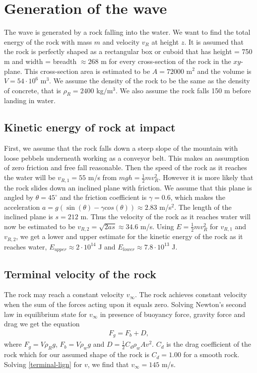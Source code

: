 \documentclass[11pt]{article}
\begin{document}
\section{Generation of the wave}
The wave is generated by a rock falling into the water. We want to find the total energy of the rock with mass $m$ and velocity $v_R$ at height $z$. It is assumed that the rock is
perfectly shaped as a rectangular box or cuboid that has height = 750 m and  width = breadth $\approx 268$ m for every cross-section of the rock in the $xy$-plane. This cross-section area
is estimated to be  $A=72000$ m$^2$ and the volume is $V= 54 \cdot 10^6$ m$^3$. We assume the density of the rock to be the same as the density of concrete, that is $\rho_{R}=2400$ kg$/$m$^3$.
We also assume the rock falls 150 m before landing in water.

\subsection{Kinetic energy of rock at impact}
First, we assume that the rock falls down a steep slope of the mountain with loose pebbels underneath working as a conveyor belt. This makes an assumption of zero friction and free fall reasonable.
Then the speed of the rock as it reaches the water will be $v_{R,1}=55$ m/s from $mgh=\frac{1}{2}mv_R^2$. However it is more likely that the rock slides down an inclined plane with friction.
We assume that this plane is angled by $\theta=45^{\circ}$  and the friction coefficient is $\gamma=0.6$, which makes the acceleration $a=g(\sin(\theta) - \gamma cos(\theta)) \approx 2.83$ m/s$^2$.
The length of the inclined plane is $s=212$ m. Thus the velocity of the rock as it reaches water will now be estimated to be $v_{R,2}=\sqrt{2as} \approx 34.6$ m/s.
Using $E =\frac{1}{2}m v_R^2$ for $v_{R,1}$ and $v_{R,2}$, we get a lower and upper estimate for the kinetic energy of the rock as it reaches water, $E_{upper} \approx 2 \cdot 10^{14}$ J and $E_{lower} \approx 7.8 \cdot 10^{13}$ J.

\subsection{Terminal velocity of the rock}
The rock may reach a constant velocity $v_{\infty}$. The rock achieves constant velocity when the sum of the forces acting upon it equals zero. Solving Newton's second law in equilibrium state for
$v_{\infty}$ in presence of buoyancy force, gravity force and drag we get the equation
\begin{align}
    \label{terminal-lign}
    F_g=F_b + D,
\end{align}
where $F_g=V\rho_{R}g$, $F_b= V \rho_{w}g$ and $D=\frac{1}{2}C_d\rho_{w}Av^2$. $C_d$ is the drag coefficient of the rock which for our assumed shape of the rock is $C_d=1.00$ for a smooth rock.
Solving \eqref{terminal-lign} for $v$, we find that $v_{\infty} = 145$ m/s. 
\end{document}
